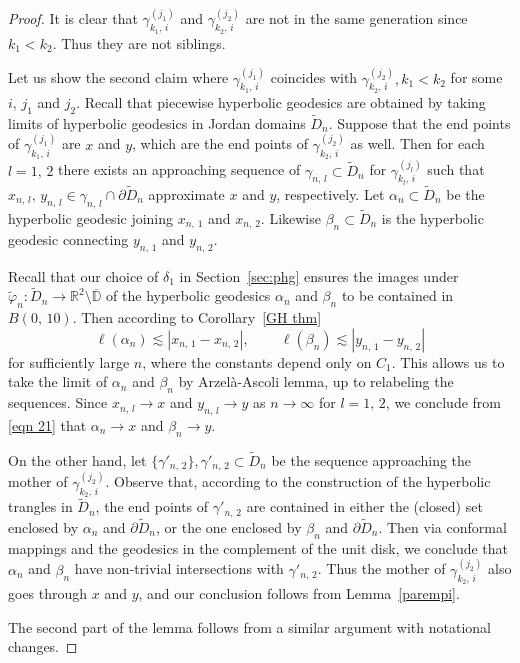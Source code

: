 \documentclass[reqno,11pt]{amsart}
\def\az{\alpha}
\def\wz{\widetilde}
\def\ls{\lesssim}
\numberwithin{equation}{section}
\theoremstyle{remark}
\begin{document}
\begin{proof}
It is clear that $\gamma_{k_1,\,i}^{(j_1)}$ and $\gamma_{k_2,\,i}^{(j_2)}$ are not in the same generation since $k_1<k_2$. Thus they are not siblings. 

Let us show the second claim where $\gamma_{k_1,\,i}^{(j_1)}$ coincides with $\gamma_{k_2,\,i}^{(j_2)}, k_1<k_2$ for some $i,\,j_1$ and $j_2$. 
Recall that piecewise hyperbolic geodesics are obtained by taking  limits of hyperbolic geodesics in Jordan domains $\wz D_n$. Suppose that the end points of $\gamma_{k_1,\,i}^{(j_1)}$ are $x$ and $y$,  which are  the end points of $\gamma_{k_2,\,i}^{(j_2)}$ as well.  Then for each $l=1,\,2$ there exists an approaching sequence of  $\gamma_{n,\,l}\subset \wz D_n$ for $\gamma_{k_l,\,i}^{(j_l)}$ such that  $x_{n,\,l},\, y_{n,\,l}\in \gamma_{n,\,l}\cap\partial \wz D_n$ approximate $x$ and $y$, respectively. Let $\az_n\subset \wz D_n$ be the hyperbolic geodesic joining $x_{n,\,1}$ and $x_{n,\,2}$. Likewise $\beta_n \subset \wz D_n$  is the hyperbolic geodesic connecting  $y_{n,\,1}$ and $y_{n,\,2}$.


Recall that our choice of $\delta_1$ in Section~\ref{sec:phg} ensures the images under $\wz \varphi_n\colon \wz D_n\to \mathbb R^2\setminus \overline{\mathbb D}$ of the hyperbolic geodesics $\az_n$ and $\beta_n$ to be contained in $B(0,\,10)$. Then according to Corollary~\ref{GH thm} \begin{equation}\label{eqn 21}
\ell(\az_n) \ls |x_{n,\,1}-x_{n,\,2}|,\, \qquad \ell(\beta_n) \ls |y_{n,\,1}- y_{n,\,2}|
\end{equation}
for sufficiently large $n$, where the constants depend only on $C_1$. 
This allows us to take the limit of $\az_n$ and $\beta_n$ by Arzel\`a-Ascoli lemma, up to relabeling the sequences. Since $x_{n,\,l}\to x$ and $y_{n,\,l} \to y$ as $n\to \infty$ for $l=1,\,2$, we conclude from \eqref{eqn 21} that $\az_n \to x$ and $\beta_n\to y$. 

On the other hand, let  $\{\gamma'_{n,\,2}\}, \gamma'_{n,\,2}\subset \wz D_n$ be the sequence approaching the mother of $\gamma_{k_2,\,i}^{(j_2)}$. Observe that, according to the construction of the hyperbolic trangles in $\wz D_n$, the end points of $\gamma'_{n,\,2}$ are contained in either  the (closed) set enclosed by $\az_n$ and $\partial \wz D_n$, or the one enclosed by $\beta_n$ and $\partial \wz D_n$. Then via conformal mappings and  the geodesics in the complement of the unit disk,  we conclude that $\az_n$ and $\beta_n$ have non-trivial intersections with $\gamma'_{n,\,2}$. Thus the mother of $\gamma_{k_2,\,i}^{(j_2)}$ also goes through $x$ and $y$, and our conclusion follows from Lemma~\ref{parempi}. 

The second part of the lemma follows from a similar argument with notational changes. 
\end{proof}
\end{document}
